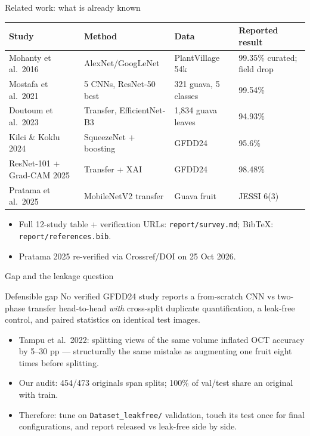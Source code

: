 \documentclass[aspectratio=169]{beamer}
\begin{document}
\begin{frame}{Related work: what is already known}
  \scriptsize
  \begin{tabular}{llll}
    \toprule
    Study & Method & Data & Reported result \\
    \midrule
    Mohanty et al.\ 2016 & AlexNet/GoogLeNet & PlantVillage 54k & 99.35\% curated; field drop \\
    Mostafa et al.\ 2021 & 5 CNNs, ResNet-50 best & 321 guava, 5 classes & 99.54\% \\
    Doutoum et al.\ 2023 & Transfer, EfficientNet-B3 & 1,834 guava leaves & 94.93\% \\
    Kilci \& Koklu 2024 & SqueezeNet + boosting & GFDD24 & 95.6\% \\
    ResNet-101 + Grad-CAM 2025 & Transfer + XAI & GFDD24 & 98.48\% \\
    Pratama et al.\ 2025 & MobileNetV2 transfer & Guava fruit & JESSI 6(3) \\
    \bottomrule
  \end{tabular}
  \vspace{2mm}
  \begin{itemize}
    \item Full 12-study table + verification URLs: \texttt{report/survey.md};
          BibTeX: \texttt{report/references.bib}.
    \item Pratama 2025 re-verified via Crossref/DOI on 25 Oct 2026.
  \end{itemize}
\end{frame}
\begin{frame}{Gap and the leakage question}
  \begin{block}{Defensible gap}
    No verified GFDD24 study reports a from-scratch CNN vs two-phase transfer
    head-to-head \emph{with} cross-split duplicate quantification, a leak-free
    control, and paired statistics on identical test images.
  \end{block}
  \begin{itemize}
    \item Tampu et al.\ 2022: splitting views of the same volume inflated OCT
          accuracy by 5--30 pp --- structurally the same mistake as
          augmenting one fruit eight times before splitting.
    \item Our audit: 454/473 originals span splits; 100\% of val/test share an
          original with train.
    \item Therefore: tune on \texttt{Dataset\_leakfree/} validation, touch its
          test once for final configurations, and report released vs leak-free
          side by side.
  \end{itemize}
\end{frame}
\end{document}
